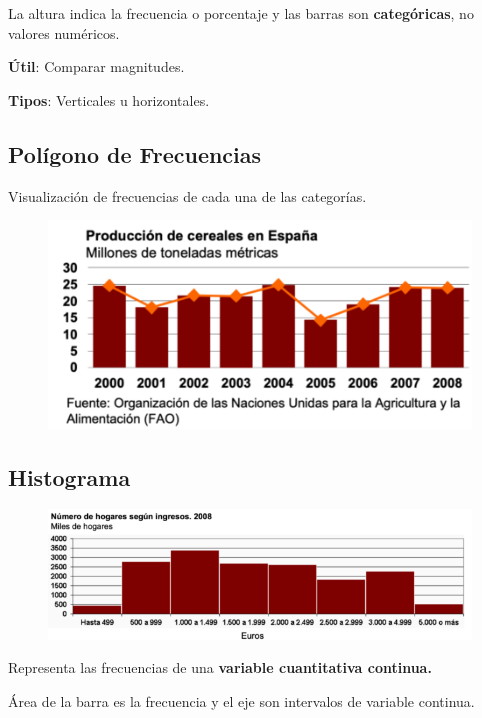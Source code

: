 \documentclass[12pt]{report} %
\begin{document}
La altura indica la frecuencia o porcentaje y las barras son
\textbf{categóricas}, no valores numéricos.

\textbf{Útil}: Comparar magnitudes.

\textbf{Tipos}: Verticales u horizontales.

\subsection{Polígono de
Frecuencias}

Visualización de frecuencias de cada una de las categorías.
\begin{figure}[H]
	{\includegraphics[scale=.5]{Untitled 6.png}}
\end{figure}

\subsection{Histograma}

\begin{figure}[H]
	{\includegraphics[scale=.4]{Untitled 7.png}}
\end{figure}
Representa las frecuencias de una \textbf{variable cuantitativa
continua.}

Área de la barra es la frecuencia y el eje son intervalos de variable
continua.
\end{document}
